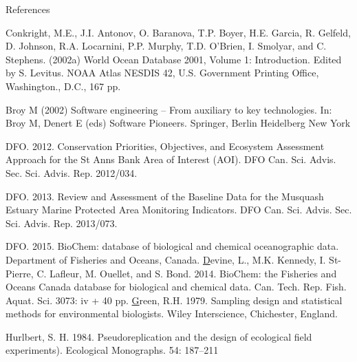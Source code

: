 \documentclass[letterpaper,portrait,12pt]{scrartcl}
\numberwithin{equation}{section}		%
\numberwithin{figure}{section}			%
\numberwithin{table}{section}				%
\begin{document}
\newpage





\begin{thebibliography}{99.}

References


 Conkright, M.E., J.I. Antonov, O. Baranova, T.P. Boyer, H.E. Garcia, R. Gelfeld, D. Johnson, R.A. Locarnini, P.P. Murphy, T.D. O'Brien, I. Smolyar, and C. Stephens. (2002a)  World Ocean Database 2001, Volume 1: Introduction. Edited by S. Levitus. NOAA Atlas NESDIS 42, U.S. Government Printing Office, Washington., D.C., 167 pp.


 Broy M (2002) Software engineering -- From
auxiliary to key technologies. In: Broy M, Denert E (eds)
Software Pioneers. Springer, Berlin Heidelberg New York
\end{thebibliography}





DFO. 2012. Conservation Priorities, Objectives, and Ecosystem Assessment Approach for the St Anns Bank Area of Interest (AOI). DFO Can. Sci. Advis. Sec. Sci. Advis. Rep. 2012/034.

DFO. 2013. Review and Assessment of the Baseline Data for the Musquash Estuary Marine Protected Area Monitoring Indicators. DFO Can. Sci. Advis. Sec. Sci. Advis. Rep. 2013/073.

DFO. 2015. BioChem: database of biological and chemical oceanographic data. Department of Fisheries and Oceans, Canada. \href{http://www.meds-sdmm.dfo-mpo.gc.ca/BioChem/biochem-eng.htm}

Devine, L., M.K. Kennedy, I. St-Pierre, C. Lafleur, M. Ouellet, and S. Bond. 2014. BioChem: the Fisheries and Oceans Canada database for biological and chemical data. Can. Tech. Rep. Fish. Aquat. Sci. 3073: iv + 40 pp. \href{http://www.dfo-mpo.gc.ca/Library/351319.pdf}


Green, R.H. 1979. Sampling design and statistical methods for environmental biologists. Wiley Interscience, Chichester, England.




 Hurlbert, S. H. 1984. Pseudoreplication and the design of ecological field experiments). Ecological Monographs. 54: 187--211
\end{document}
